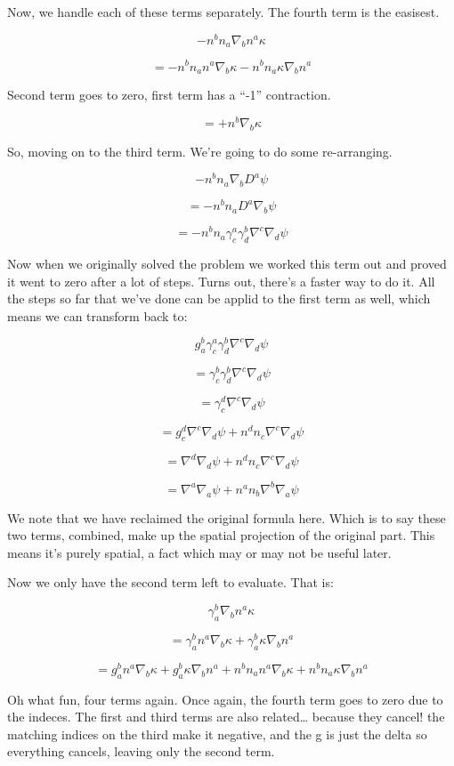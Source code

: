 \documentclass[landscape,letterpaper,10pt,english]{article}
\begin{document}
    Now, we handle each of these terms separately. The fourth term is the
easisest.

\[ -n^bn_a \nabla_b n^a \kappa \]

\[ = -n^bn_a n^a \nabla_b \kappa -n^bn_a \kappa \nabla_b n^a \]

Second term goes to zero, first term has a ``-1'' contraction.

\[ = + n^b \nabla_b \kappa \]

So, moving on to the third term. We're going to do some re-arranging.

\[ -n^bn_a \nabla_b D^a \psi \]

\[ = -n^bn_a D^a \nabla_b \psi \]

\[ = -n^bn_a \gamma^a_c \gamma_d^b \nabla^c \nabla_d \psi \]

Now when we originally solved the problem we worked this term out and
proved it went to zero after a lot of steps. Turns out, there's a faster
way to do it. All the steps so far that we've done can be applid to the
first term as well, which means we can transform back to:

\[ g^b_a \gamma^a_c \gamma_d^b \nabla^c \nabla_d \psi \]

\[ = \gamma^b_c \gamma_d^b \nabla^c \nabla_d \psi \]

\[ = \gamma^d_c \nabla^c \nabla_d \psi \]

\[ = g^d_c \nabla^c \nabla_d \psi + n^dn_c \nabla^c \nabla_d \psi \]

\[ = \nabla^d \nabla_d \psi + n^dn_c \nabla^c \nabla_d \psi \]

\[ = \nabla^a \nabla_a \psi + n^an_b \nabla^b \nabla_a \psi \]

We note that we have reclaimed the original formula here. Which is to
say these two terms, combined, make up the spatial projection of the
original part. This means it's purely spatial, a fact which may or may
not be useful later.

    Now we only have the second term left to evaluate. That is:

\[ \gamma^b_a \nabla_b n^a \kappa \]

\[ = \gamma^b_a n^a \nabla_b \kappa + \gamma^b_a \kappa \nabla_b n^a\]

\[ = g^b_a n^a \nabla_b \kappa + g^b_a \kappa \nabla_b n^a + n^bn_a n^a \nabla_b \kappa + n^bn_a \kappa \nabla_b n^a\]

    Oh what fun, four terms again. Once again, the fourth term goes to zero
due to the indeces. The first and third terms are also related\ldots{}
because they cancel! the matching indices on the third make it negative,
and the g is just the delta so everything cancels, leaving only the
second term.
\end{document}
